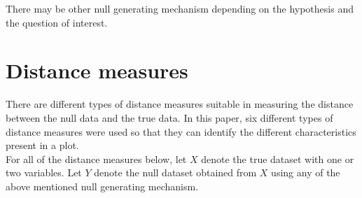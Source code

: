 \documentclass[12]{article}
\newcommand{\blue}[1]{{\color{blue} #1}}
\newcommand{\red}[1]{{\color{red} #1}}
\begin{document}
There may be other null generating mechanism depending on the hypothesis and the question of interest.

\section{Distance measures}

%
%

%

There are different types of distance measures suitable in measuring the distance between the null data and the true data. In this paper, six different types of distance measures were used so that they can identify the different characteristics present in a plot. \\

For all of the distance measures below, let $X$ denote the true dataset with one or two variables. Let $Y$ denote the null dataset obtained from $X$ using any of the above mentioned null generating mechanism.
\end{document}
